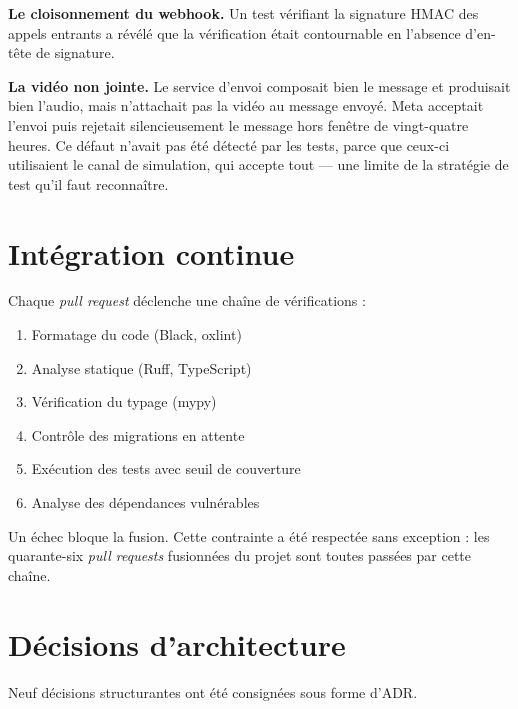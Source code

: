 \documentclass[11pt,a4paper]{report}
\begin{document}
\textbf{Le cloisonnement du webhook.} Un test vérifiant la signature HMAC des
appels entrants a révélé que la vérification était contournable en l'absence
d'en-tête de signature.

\textbf{La vidéo non jointe.} Le service d'envoi composait bien le message et
produisait bien l'audio, mais n'attachait pas la vidéo au message envoyé.
Meta acceptait l'envoi puis rejetait silencieusement le message hors fenêtre
de vingt-quatre heures. Ce défaut n'avait pas été détecté par les tests,
parce que ceux-ci utilisaient le canal de simulation, qui accepte tout — une
limite de la stratégie de test qu'il faut reconnaître.

\section{Intégration continue}

Chaque \emph{pull request} déclenche une chaîne de vérifications :

\begin{enumerate}[leftmargin=1cm]
  \item Formatage du code (Black, oxlint)
  \item Analyse statique (Ruff, TypeScript)
  \item Vérification du typage (mypy)
  \item Contrôle des migrations en attente
  \item Exécution des tests avec seuil de couverture
  \item Analyse des dépendances vulnérables
\end{enumerate}

Un échec bloque la fusion. Cette contrainte a été respectée sans exception :
les quarante-six \emph{pull requests} fusionnées du projet sont toutes
passées par cette chaîne.

\section{Décisions d'architecture}

Neuf décisions structurantes ont été consignées sous forme d'ADR.
\end{document}
